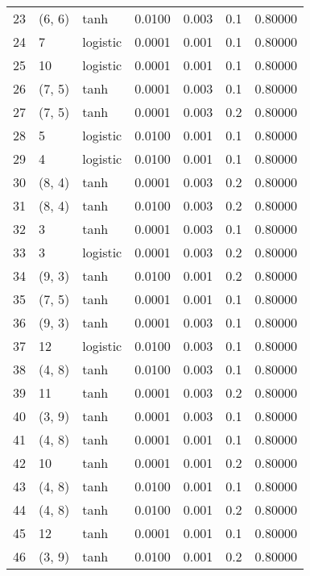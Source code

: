 \begin{tabular}{lllrrrr}
23  &      (6, 6) &      tanh &  0.0100 &  0.003 &  0.1 &   0.80000 \\
24  &           7 &  logistic &  0.0001 &  0.001 &  0.1 &   0.80000 \\
25  &          10 &  logistic &  0.0001 &  0.001 &  0.1 &   0.80000 \\
26  &      (7, 5) &      tanh &  0.0001 &  0.003 &  0.1 &   0.80000 \\
27  &      (7, 5) &      tanh &  0.0001 &  0.003 &  0.2 &   0.80000 \\
28  &           5 &  logistic &  0.0100 &  0.001 &  0.1 &   0.80000 \\
29  &           4 &  logistic &  0.0100 &  0.001 &  0.1 &   0.80000 \\
30  &      (8, 4) &      tanh &  0.0001 &  0.003 &  0.2 &   0.80000 \\
31  &      (8, 4) &      tanh &  0.0100 &  0.003 &  0.2 &   0.80000 \\
32  &           3 &      tanh &  0.0001 &  0.003 &  0.1 &   0.80000 \\
33  &           3 &  logistic &  0.0001 &  0.003 &  0.2 &   0.80000 \\
34  &      (9, 3) &      tanh &  0.0100 &  0.001 &  0.2 &   0.80000 \\
35  &      (7, 5) &      tanh &  0.0001 &  0.001 &  0.1 &   0.80000 \\
36  &      (9, 3) &      tanh &  0.0001 &  0.003 &  0.1 &   0.80000 \\
37  &          12 &  logistic &  0.0100 &  0.003 &  0.1 &   0.80000 \\
38  &      (4, 8) &      tanh &  0.0100 &  0.003 &  0.1 &   0.80000 \\
39  &          11 &      tanh &  0.0001 &  0.003 &  0.2 &   0.80000 \\
40  &      (3, 9) &      tanh &  0.0001 &  0.003 &  0.1 &   0.80000 \\
41  &      (4, 8) &      tanh &  0.0001 &  0.001 &  0.1 &   0.80000 \\
42  &          10 &      tanh &  0.0001 &  0.001 &  0.2 &   0.80000 \\
43  &      (4, 8) &      tanh &  0.0100 &  0.001 &  0.1 &   0.80000 \\
44  &      (4, 8) &      tanh &  0.0100 &  0.001 &  0.2 &   0.80000 \\
45  &          12 &      tanh &  0.0001 &  0.001 &  0.1 &   0.80000 \\
46  &      (3, 9) &      tanh &  0.0100 &  0.001 &  0.2 &   0.80000 \\

\end{tabular}
